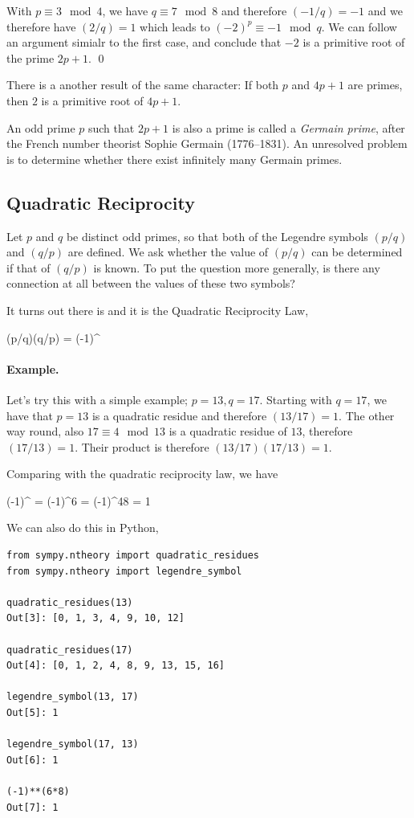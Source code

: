 With $p \equiv 3 \mod 4$, we have $q \equiv 7 \mod 8$ and therefore $(-1/q) = -1$ and we therefore have $(2/q) = 1$ which leads to $(-2)^p \equiv -1 \mod q$. We can follow an argument simialr to the first case, and conclude that $-2$ is a primitive root of the prime $2p+1$. \qed

There is a another result of the same character: If both $p$ and $4p+1$ are primes, then $2$ is a primitive root of $4p+1$.

An odd prime $p$ such that $2p+1$ is also a prime is called a \emph{Germain prime}, after the French number theorist Sophie Germain (1776–1831). An unresolved problem is to determine whether there exist inﬁnitely many Germain primes.





\subsection{Quadratic Reciprocity}

Let $p$ and $q$ be distinct odd primes, so that both of the Legendre symbols $(p/q)$ and $(q/p)$ are defined. We ask whether the value of $(p/q)$ can be determined if that of $(q/p)$ is known. To put the question more generally, is there any connection at all between the values of these two symbols?

It turns out there is and it is the Quadratic Reciprocity Law,

\bee
(p/q)(q/p) = (-1)^{  }
\eee

\paragraph{Example.} Let's try this with a simple example; $p=13, q=17$. Starting with $q=17$, we have that $p=13$ is a quadratic residue and therefore $(13/17) = 1$. The other way round, also $17 \equiv 4 \mod 13$ is a quadratic residue of $13$, therefore $(17/13) = 1$. Their product is therefore $(13/17) (17/13) = 1$.

Comparing with the quadratic reciprocity law, we have

\bee
(-1)^{ } = (-1)^{6 } = (-1)^{48} = 1
\eee

We can also do this in Python,

\begin{verbatim}
from sympy.ntheory import quadratic_residues
from sympy.ntheory import legendre_symbol

quadratic_residues(13)
Out[3]: [0, 1, 3, 4, 9, 10, 12]

quadratic_residues(17)
Out[4]: [0, 1, 2, 4, 8, 9, 13, 15, 16]

legendre_symbol(13, 17)
Out[5]: 1

legendre_symbol(17, 13)
Out[6]: 1

(-1)**(6*8)
Out[7]: 1
\end{verbatim}



